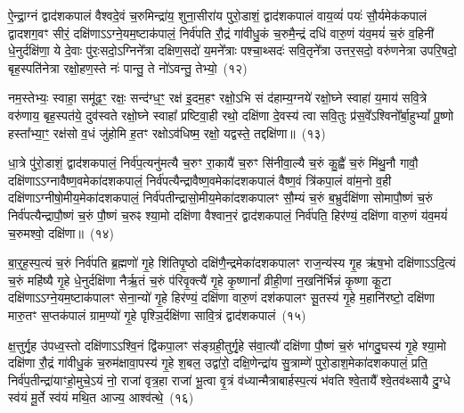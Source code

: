 {\anuvakamend[{सुभे॑षजमिहि॒ त्रीणि॑ च}]}

ऐ॒न्द्रा॒ग्नं द्वाद॑श\-कपालं वैश्वदे॒वं च॒रुमिन्द्रा॑य॒ शुना॒सीरा॑य पुरो॒डाशं॒ द्वाद॑श\-कपालं वाय॒व्यं॑ पयः॑ सौ॒र्यमेक॑कपालं द्वादशग॒वꣳ सीरं॒ दक्षि॑णा\-ऽऽ\-ग्ने॒यम॒ष्टा\-क॑पालं॒ निर्व॑पति रौ॒द्रं गा॑वीधु॒कं च॒रुमै॒न्द्रं दधि॑ वारु॒णं य॑व॒मयं॑ च॒रुं व॒हिनी॑ धे॒नुर्दक्षि॑णा॒ ये दे॒वाः पु॑रः॒सदो॒\-ऽग्निने᳚त्रा दक्षिण॒सदो॑ य॒मने᳚त्राः पश्चा॒थ्सदः॑ सवि॒तृने᳚त्रा उत्तर॒सदो॒ वरु॑णनेत्रा उपरि॒षदो॒ बृह॒स्पति॑नेत्रा रक्षो॒हण॒स्ते नः॑ पान्तु॒ ते नो॑\-ऽवन्तु॒ तेभ्यो॒~(१२)\ip

नम॒स्तेभ्यः॒ स्वाहा॒ समू॑ढ॒ꣳ॒ रक्षः॒ सन्द॑ग्ध॒ꣳ॒ रक्ष॑ इ॒दम॒हꣳ रक्षो॒\-ऽभि सं द॑हाम्य॒ग्नये॑ रक्षो॒घ्ने स्वाहा॑ य॒माय॑ सवि॒त्रे वरु॑णाय॒ बृह॒स्पत॑ये॒ दुव॑स्वते रक्षो॒घ्ने स्वाहा᳚ प्रष्टिवा॒ही रथो॒ दक्षि॑णा दे॒वस्य॑ त्वा सवि॒तुः प्र॑स॒वे᳚\-ऽश्विनो᳚र्बा॒हु\-भ्यां᳚ पू॒ष्णो हस्ता᳚भ्या॒ꣳ॒ रक्ष॑सो व॒धं जु॑होमि ह॒तꣳ रक्षो\-ऽव॑धिष्म॒ रक्षो॒ यद्वस्ते॒ तद्दक्षि॑णा॥~(१३)\ip


{\anuvakamend[{तेभ्यः॒ पञ्च॑चत्वारिꣳशच्च}]}

धा॒त्रे पु॑रो॒डाशं॒ द्वाद॑श\-कपालं॒ निर्व॑प॒त्यनु॑मत्यै च॒रुꣳ रा॒कायै॑ च॒रुꣳ सि॑नीवा॒ल्यै च॒रुं कु॒ह्वै॑ च॒रुं मि॑थु॒नौ गावौ॒ दक्षि॑णा\-ऽऽ\-ग्नावैष्ण॒वमेका॑\-दश\-कपालं॒ निर्व॑पत्यैन्द्रावैष्ण॒वमेका॑\-दश\-कपालं वैष्ण॒वं त्रि॑कपा॒लं वा॑म॒नो व॒ही दक्षि॑णा\-ऽग्नीषो॒मीय॒मेका॑\-दश\-कपालं॒ निर्व॑पतीन्द्रा\-सो॒मीय॒\-मेका॑\-दश\-कपालꣳ सौ॒म्यं च॒रुं ब॒भ्रुर्दक्षि॑णा सोमापौ॒ष्णं च॒रुं निर्व॑पत्यैन्द्रापौ॒ष्णं च॒रुं पौ॒ष्णं च॒रुꣴ श्या॒मो दक्षि॑णा वैश्वान॒रं द्वाद॑श\-कपालं॒ निर्व॑पति॒ हिर॑ण्यं॒ दक्षि॑णा वारु॒णं य॑व॒मयं॑ च॒रुमश्वो॒ दक्षि॑णा॥~(१४)\ip

{\anuvakamend[{निर॒ष्टौ च}]}

बा॒र्॒\mbox{}ह॒स्प॒त्यं च॒रुं निर्व॑पति ब्र॒ह्मणो॑ गृ॒हे शि॑तिपृ॒ष्ठो दक्षि॑णै॒न्द्रमेका॑\-दश\-कपालꣳ राज॒न्य॑स्य गृ॒ह ऋ॑ष॒भो दक्षि॑णा\-ऽऽ\-दि॒त्यं च॒रुं महि॑ष्यै गृ॒हे धे॒नुर्दक्षि॑णा नैर्\mbox{}ऋ॒तं च॒रुं प॑रिवृ॒क्त्यै॑ गृ॒हे कृ॒ष्णानां᳚ व्रीही॒णां न॒खनि॑र्भिन्नं कृ॒ष्णा कू॒टा दक्षि॑णा\-ऽऽ\-ग्ने॒यम॒ष्टाक॑पालꣳ सेना॒न्यो॑ गृ॒हे हिर॑ण्यं॒ दक्षि॑णा वारु॒णं दश॑\-कपालꣳ सू॒तस्य॑ गृ॒हे म॒हानि॑रष्टो॒ दक्षि॑णा मारु॒तꣳ स॒प्तक॑पालं ग्राम॒ण्यो॑ गृ॒हे पृश्ञि॒र्दक्षि॑णा सावि॒त्रं द्वाद॑श\-कपालं~(१५)\ip

क्ष॒त्तुर्गृ॒ह उ॑पध्व॒स्तो दक्षि॑णा\-ऽऽ\-श्वि॒नं द्वि॑कपा॒लꣳ स॑ङ्ग्रही॒तुर्गृ॒हे स॑वा॒त्यौ॑ दक्षि॑णा पौ॒ष्णं च॒रुं भा॑गदु॒घस्य॑ गृ॒हे श्या॒मो दक्षि॑णा रौ॒द्रं गा॑वीधु॒कं च॒रुम॑क्षावा॒पस्य॑ गृ॒हे श॒बल॒ उद्वा॑रो॒ दक्षि॒णेन्द्रा॑य सु॒त्राम्णे॑ पुरो॒डाश॒मेका॑\-दश\-कपालं॒ प्रति॒ निर्व॑प॒तीन्द्रा॑याꣳहो॒मुचे॒\-ऽयं नो॒ राजा॑ वृत्र॒हा राजा॑ भू॒त्वा वृ॒त्रं व॑ध्यान्मैत्राबार्\mbox{}हस्प॒त्यं भ॑वति श्वे॒तायै᳚ श्वे॒तव॑थ्सायै दु॒ग्धे स्व॑यं मू॒र्ते स्व॑यं मथि॒त आज्य॒ आश्व॑त्थे॒~(१६)\ip


